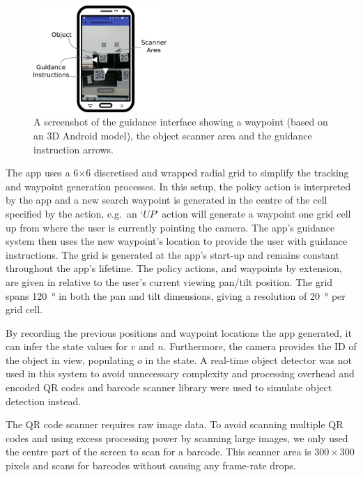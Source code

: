 \documentclass[a4paper, twoside]{article}
\begin{document}
\begin{figure}
  \centering
  \includegraphics[width=0.45\textwidth]{figures/system_screenshot2.png}
  \caption{A screenshot of the guidance interface showing a waypoint (based on an 3D Android model), the object scanner area and the guidance instruction arrows. }\label{fig:system-screenshot}
\end{figure}

The app uses a 6$\times$6 discretised and wrapped radial grid to simplify the tracking and waypoint generation processes. In this setup, the policy action is interpreted by the app and a new search waypoint is generated in the centre of the cell specified by the action, e.g.\ an `$UP$' action will generate a waypoint one grid cell up from where the user is currently pointing the camera. The app's guidance system then uses the new waypoint's location to provide the user with guidance instructions. The grid is generated at the app's start-up and remains constant throughout the app's lifetime. The policy actions, and waypoints by extension, are given in relative to the user's current viewing pan/tilt position. The grid spans \SI{120}{\degree} in both the pan and tilt dimensions, giving a resolution of \SI{20}{\degree} per grid cell. 

By recording the previous positions and waypoint locations the app generated, it can infer the state values for $v$ and $n$. Furthermore, the camera provides the ID of the object in view, populating $o$ in the state. A real-time object detector was not used in this system to avoid unnecessary complexity and processing overhead and encoded QR codes and barcode scanner library were used to simulate object detection instead. 

The QR code scanner requires raw image data. To avoid scanning multiple QR codes and using excess processing power by scanning large images, we only used the centre part of the screen to scan for a barcode. This scanner area is $300\times300$ pixels and scans for barcodes without causing any frame-rate drops.  
\end{document}
